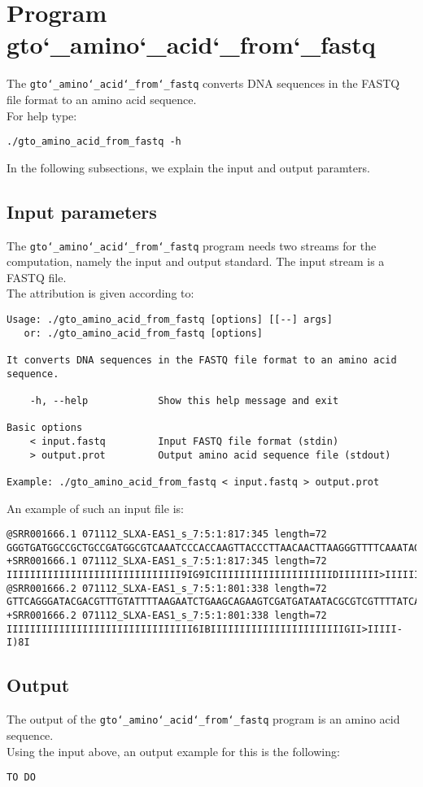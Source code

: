 \section{Program gto\char`_amino\char`_acid\char`_from\char`_fastq}
The \texttt{gto\char`_amino\char`_acid\char`_from\char`_fastq} converts DNA sequences in the FASTQ file format to an amino acid sequence.\\
For help type:
\begin{lstlisting}
./gto_amino_acid_from_fastq -h
\end{lstlisting}
In the following subsections, we explain the input and output paramters.

\subsection*{Input parameters}

The \texttt{gto\char`_amino\char`_acid\char`_from\char`_fastq} program needs two streams for the computation, namely the input and output standard. The input stream is a FASTQ file.\\
The attribution is given according to:
\begin{lstlisting}
Usage: ./gto_amino_acid_from_fastq [options] [[--] args]
   or: ./gto_amino_acid_from_fastq [options]

It converts DNA sequences in the FASTQ file format to an amino acid sequence.

    -h, --help            Show this help message and exit

Basic options
    < input.fastq         Input FASTQ file format (stdin)
    > output.prot         Output amino acid sequence file (stdout)

Example: ./gto_amino_acid_from_fastq < input.fastq > output.prot
\end{lstlisting}
An example of such an input file is:
\begin{lstlisting}
@SRR001666.1 071112_SLXA-EAS1_s_7:5:1:817:345 length=72
GGGTGATGGCCGCTGCCGATGGCGTCAAATCCCACCAAGTTACCCTTAACAACTTAAGGGTTTTCAAATAGA
+SRR001666.1 071112_SLXA-EAS1_s_7:5:1:817:345 length=72
IIIIIIIIIIIIIIIIIIIIIIIIIIIIII9IG9ICIIIIIIIIIIIIIIIIIIIIDIIIIIII>IIIIII/
@SRR001666.2 071112_SLXA-EAS1_s_7:5:1:801:338 length=72
GTTCAGGGATACGACGTTTGTATTTTAAGAATCTGAAGCAGAAGTCGATGATAATACGCGTCGTTTTATCAT
+SRR001666.2 071112_SLXA-EAS1_s_7:5:1:801:338 length=72
IIIIIIIIIIIIIIIIIIIIIIIIIIIIIIII6IBIIIIIIIIIIIIIIIIIIIIIIIGII>IIIII-I)8I
\end{lstlisting}

\subsection*{Output}

The output of the \texttt{gto\char`_amino\char`_acid\char`_from\char`_fastq} program is an amino acid sequence.\\
Using the input above, an output example for this is the following:
\begin{lstlisting}
TO DO
\end{lstlisting}
